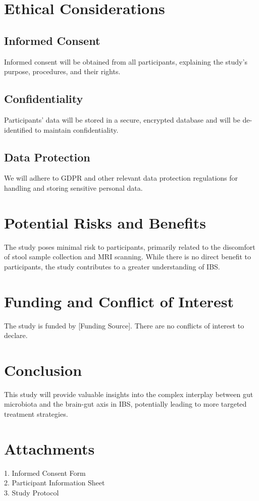 \documentclass[11pt,a4paper]{article}
\begin{document}
\section{Ethical Considerations}
\subsection{Informed Consent}
Informed consent will be obtained from all participants, explaining the study's purpose, procedures, and their rights.

\subsection{Confidentiality}
Participants' data will be stored in a secure, encrypted database and will be de-identified to maintain confidentiality.

\subsection{Data Protection}
We will adhere to GDPR and other relevant data protection regulations for handling and storing sensitive personal data.

\section{Potential Risks and Benefits}
The study poses minimal risk to participants, primarily related to the discomfort of stool sample collection and MRI scanning. While there is no direct benefit to participants, the study contributes to a greater understanding of IBS.

\section{Funding and Conflict of Interest}
The study is funded by [Funding Source]. There are no conflicts of interest to declare.

\section{Conclusion}
This study will provide valuable insights into the complex interplay between gut microbiota and the brain-gut axis in IBS, potentially leading to more targeted treatment strategies.

\section{Attachments}
1. Informed Consent Form\\
2. Participant Information Sheet\\
3. Study Protocol
\end{document}
